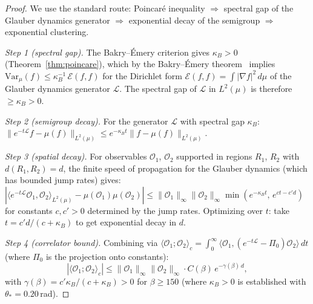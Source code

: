\documentclass[11pt]{article}
\theoremstyle{definition}
\begin{document}
\begin{proof}
We use the standard route: Poincar\'e inequality $\Rightarrow$ spectral
gap of the Glauber dynamics generator $\Rightarrow$ exponential decay
of the semigroup $\Rightarrow$ exponential clustering.

\textit{Step 1 (spectral gap).}
The Bakry--\'Emery criterion gives $\kappa_B>0$
(Theorem~\ref{thm:poincare}), which by the Bakry--\'Emery
theorem~\cite{BakryEmery} implies $\mathrm{Var}_\mu(f)\le
\kappa_B^{-1}\,\mathcal{E}(f,f)$ for the Dirichlet form
$\mathcal{E}(f,f)=\int|\nabla f|^2\,d\mu$ of the Glauber dynamics
generator $\mathcal{L}$.  The spectral gap of $\mathcal{L}$ in
$L^2(\mu)$ is therefore $\ge\kappa_B>0$.

\textit{Step 2 (semigroup decay).}
For the generator $\mathcal{L}$ with spectral gap $\kappa_B$:
$\|e^{-t\mathcal{L}}f-\mu(f)\|_{L^2(\mu)}
\le e^{-\kappa_B t}\|f-\mu(f)\|_{L^2(\mu)}$.

\textit{Step 3 (spatial decay).}
For observables $\mathcal{O}_1$, $\mathcal{O}_2$ supported in regions
$R_1$, $R_2$ with $d(R_1,R_2)=d$, the finite speed of propagation
for the Glauber dynamics (which has bounded jump rates) gives:
$|\langle e^{-t\mathcal{L}}\mathcal{O}_1,
\mathcal{O}_2\rangle_{L^2(\mu)}-\mu(\mathcal{O}_1)\mu(\mathcal{O}_2)|
\le\|\mathcal{O}_1\|_\infty\|\mathcal{O}_2\|_\infty
\min(e^{-\kappa_B t},\,e^{ct-c'd})$
for constants $c,c'>0$ determined by the jump rates.  Optimizing over
$t$: take $t=c'd/(c+\kappa_B)$ to get exponential decay in $d$.

\textit{Step 4 (correlator bound).}
Combining via $\langle\mathcal{O}_1;\mathcal{O}_2\rangle_c
=\int_0^\infty\langle\mathcal{O}_1,
(e^{-t\mathcal{L}}-\Pi_0)\mathcal{O}_2\rangle\,dt$
(where $\Pi_0$ is the projection onto constants):
\[
|\langle\mathcal{O}_1;\mathcal{O}_2\rangle_c|
\le\|\mathcal{O}_1\|_\infty\|\mathcal{O}_2\|_\infty
\cdot C(\beta)\,e^{-\gamma(\beta)\,d},
\]
with $\gamma(\beta)=c'\kappa_B/(c+\kappa_B)>0$ for $\beta\ge 150$
(where $\kappa_B>0$ is established with $\theta_*=0.20$\,rad).
\end{proof}
\end{document}
